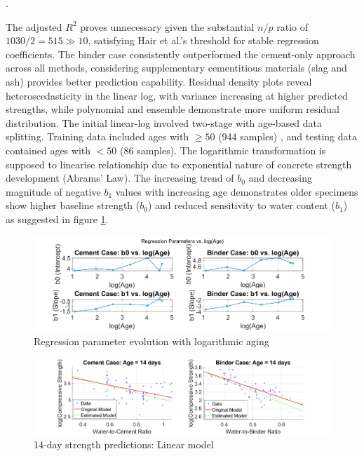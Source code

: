 .\documentclass[a4paper,11pt]{article}
\begin{document}
\vspace{-10pt}
The adjusted $R^2$ proves unnecessary given the substantial $n/p$ ratio of $1030/2 = 515 \gg 10$, satisfying Hair et al.'s threshold for stable regression coefficients. The binder case consistently outperformed the cement-only approach across all methods, considering supplementary cementitious materials (slag and ash) provides better prediction capability. Residual density plots reveal heteroscedasticity in the linear log, with variance increasing at higher predicted strengths, while polynomial and ensemble demonstrate more uniform residual distribution. The initial  linear-log involved two-stage with age-based data splitting. Training data included ages with $\geq50$ (944 samples) , and testing data contained ages with $<50$  (86 samples). The logarithmic transformation is supposed to linearise relationship due to exponential nature of concrete strength development (Abrams' Law). The increasing trend of $b_0$ and decreasing magnitude of negative $b_1$ values with increasing age demonstrates older specimens show higher baseline strength ($b_0$) and reduced sensitivity to water content ($b_1$) as suggested in figure \ref{fig:param_dynamics}.

 \vspace{-10pt}

\begin{figure}[h]
\centering
\includegraphics[width=\textwidth]{parameter_regressions.png}
     \vspace{-25pt}
\caption{Regression parameter evolution with logarithmic aging}
\label{fig:param_dynamics}
\end{figure}
\vspace{-20pt}


\begin{figure}[h]
\centering
\includegraphics[width=\textwidth]{second_Linear_regression_14_day_Strength_vs_Water_Binder_Ratio.png}
     \vspace{-25pt}
\caption{14-day strength predictions: Linear model}
\label{fig:14day}
\end{figure}
 
\end{document}
